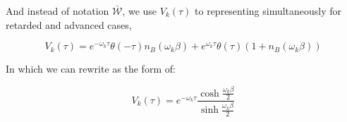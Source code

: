 \documentclass{article}[12pt]
\numberwithin{equation}{section}
\begin{document}
\begin{spacing}{1.5}
And instead of notation $\mathcal{\bar{W}}$, we use $V_k(\tau)$  to representing simultaneously for retarded and advanced cases, 

$$
V_k(\tau) = e^{-\omega_k\tau}\theta(-\tau)n_B(\omega_k \beta)  + e^{\omega_k\tau}\theta(\tau)(1+n_B(\omega_k \beta))
$$

In which we can rewrite as the form of:

$$
V_k(\tau)= e^{-\omega_k\tau} \frac{\cosh{\frac{\omega_k \beta}{2}}}{\sinh{\frac{\omega_k\beta}{2}}}
$$


\end{spacing}
\end{document}
